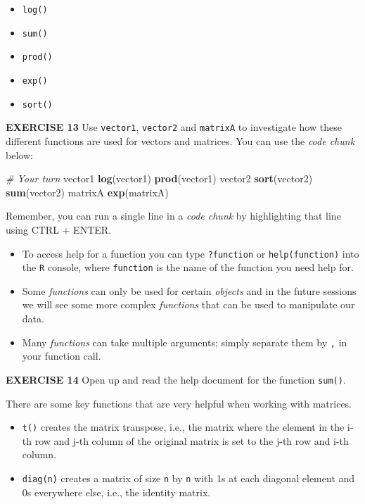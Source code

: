 \documentclass[
]{article}
\newenvironment{Shaded}{\begin{snugshade}}{\end{snugshade}}
\newcommand{\CommentTok}[1]{\textcolor[rgb]{0.56,0.35,0.01}{\textit{#1}}}
\newcommand{\KeywordTok}[1]{\textcolor[rgb]{0.13,0.29,0.53}{\textbf{#1}}}
\newcommand{\NormalTok}[1]{#1}
\begin{document}
\begin{itemize}
\item
  \texttt{log()}
\item
  \texttt{sum()}
\item
  \texttt{prod()}
\item
  \texttt{exp()}
\item
  \texttt{sort()}
\end{itemize}

\textbf{EXERCISE 13} Use \texttt{vector1}, \texttt{vector2} and
\texttt{matrixA} to investigate how these different functions are used
for vectors and matrices. You can use the \emph{code chunk} below:

\begin{Shaded}
\begin{Highlighting}[]
\CommentTok{# Your turn}
\NormalTok{vector1}
\KeywordTok{log}\NormalTok{(vector1)}
\KeywordTok{prod}\NormalTok{(vector1)}
\NormalTok{vector2}
\KeywordTok{sort}\NormalTok{(vector2)}
\KeywordTok{sum}\NormalTok{(vector2)}
\NormalTok{matrixA}
\KeywordTok{exp}\NormalTok{(matrixA)}
\end{Highlighting}
\end{Shaded}

Remember, you can run a single line in a \emph{code chunk} by
highlighting that line using CTRL + ENTER.

\begin{itemize}
\item
  To access help for a function you can type \texttt{?function} or
  \texttt{help(function)} into the \texttt{R} console, where
  \texttt{function} is the name of the function you need help for.
\item
  Some \emph{functions} can only be used for certain \emph{objects} and
  in the future sessions we will see some more complex \emph{functions}
  that can be used to manipulate our data.
\item
  Many \emph{functions} can take multiple arguments; simply separate
  them by \texttt{,} in your function call.
\end{itemize}

\textbf{EXERCISE 14} Open up and read the help document for the function
\texttt{sum()}.

There are some key functions that are very helpful when working with
matrices.

\begin{itemize}
\item
  \texttt{t()} creates the matrix transpose, i.e., the matrix where the
  element in the i-th row and j-th column of the original matrix is set
  to the j-th row and i-th column.
\item
  \texttt{diag(n)} creates a matrix of size \texttt{n} by \texttt{n}
  with 1s at each diagonal element and 0s everywhere else, i.e., the
  identity matrix.
\end{itemize}
\end{document}
